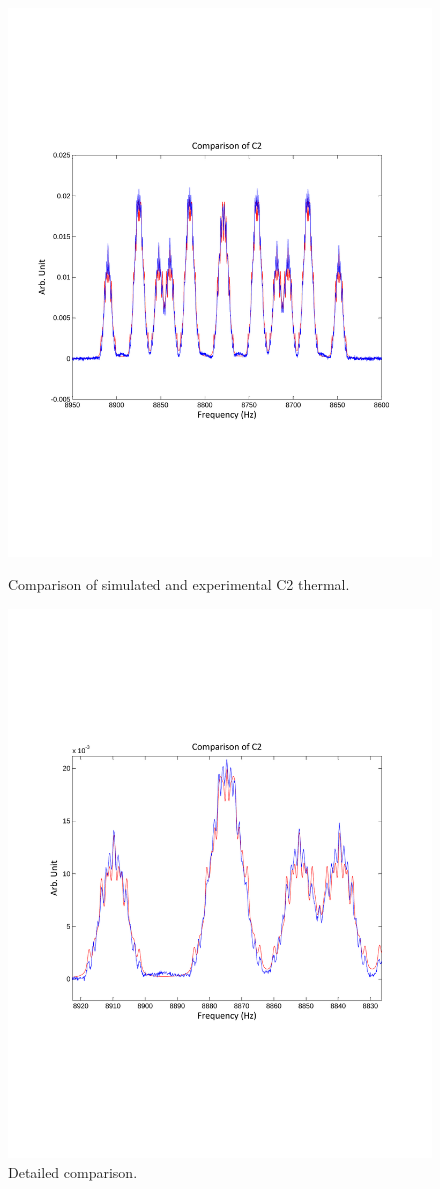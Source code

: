 \begin{figure}
\begin{minipage}[hbtp]{0.5\linewidth}
\centering
\includegraphics[width=0.8\columnwidth]{comparison_C2.pdf}
\caption{Comparison of simulated and experimental C2 thermal.}
\label{fig:side:a}
\end{minipage}%
\begin{minipage}[hbtp]{0.5\linewidth}
\centering
\includegraphics[width=0.8\columnwidth]{comparison_C2_zoomin.pdf}
\caption{Detailed comparison.}
\label{fig:side:b}
\end{minipage}
\end{figure}

